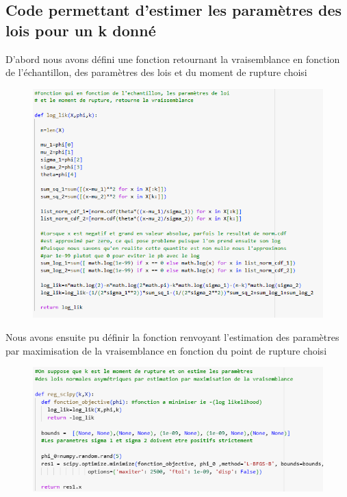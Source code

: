 \subsection{Code permettant d'estimer les paramètres des lois pour un k donné}

D'abord nous avons défini une fonction retournant la vraisemblance en fonction de l'échantillon, des paramètres des lois et du moment de rupture choisi

\begin{figure}[H]
  \includegraphics[width=1\textwidth]{ANNEXE_1.png}

\end{figure}

Nous avons ensuite pu définir la fonction renvoyant l'estimation des paramètres par maximisation de la vraisemblance en fonction du point de rupture choisi

\begin{figure}[H]
  \includegraphics[width=1\textwidth]{ANNEXE_2.png}
\end{figure}


